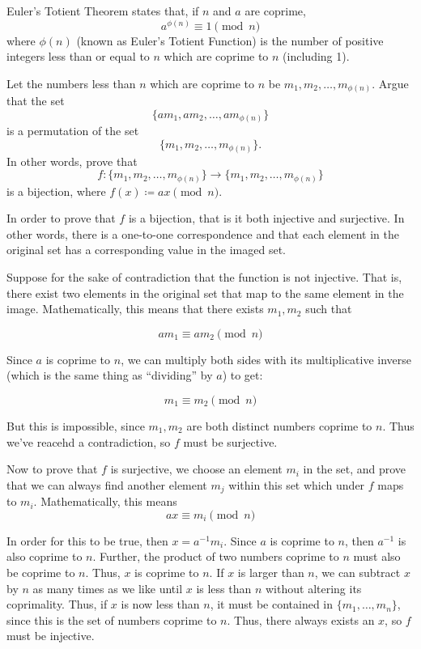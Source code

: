 \documentclass[11pt]{article}
\begin{document}
\pagebreak
{} 
Euler's Totient Theorem states that, if $n$ and $a$ are coprime,
\[
  a^{\phi(n)} \equiv 1 \pmod{n}
\]
where $\phi(n)$ (known as Euler's Totient Function) is the number of positive
integers less than or equal to $n$ which are coprime to $n$ (including 1).

\begin{Parts}
  \Part Let the numbers less than $n$ which are coprime to $n$ be $m_1, m_2, \ldots, m_{\phi(n)}$. 
  Argue that the set
  \[\{am_1, am_2, \ldots, am_{\phi(n)}\}\]
  is a permutation of the set
  \[\{m_1, m_2, \ldots, m_{\phi(n)}\}.\]
  In other words, prove that 
  \[f:\{m_1, m_2, \ldots, m_{\phi(n)}\} \to \{m_1, m_2, \ldots, m_{\phi(n)}\}\]
  is a bijection, where $f(x) \coloneqq ax \pmod{n}$.


  \begin{solution}
    In order to prove that $f$ is a bijection, that is it both injective and surjective. In other words, there is a one-to-one correspondence and that each element in the original set has a corresponding value in the imaged set.

    Suppose for the sake of contradiction that the function is not injective. That is, there exist two elements in the original set that map to the same element in the image. Mathematically, this means that there exists $m_1, m_2$ such that 

    \[ am_1 \equiv am_2 \pmod n\]
    
    Since $a$ is coprime to $n$, we can multiply both sides with its multiplicative inverse (which is the same thing as ``dividing'' by $a$) to get:
    
    \[ m_1 \equiv m_2 \pmod n\]

    But this is impossible, since $m_1, m_2$ are both distinct numbers coprime to $n$. Thus we've reacehd a contradiction, so $f$ must be surjective. 

    Now to prove that $f$ is surjective, we choose an element $m_i$ in the set, and prove that we can always find another element $m_j$ within this set which under $f$ maps to $m_i$. Mathematically, this means 
    \[ ax \equiv m_i \pmod n\]
    
    In order for this to be true, then $x = a^{-1}m_i$. Since $a$ is coprime to $n$, then $a^{-1}$ is also coprime to $n$. Further, the product of two numbers coprime to $n$ must also be coprime to $n$. Thus, $x$ is coprime to $n$. If $x$ is larger than $n$, we can subtract $x$ by $n$ as many times as we like until $x$ is less than $n$ without altering its coprimality. Thus, if $x$ is now less than $n$, it must be contained in $\{m_1, \dots, m_n\}$, since this is the set of numbers coprime to $n$. Thus, there always exists an $x$, so $f$ must be injective.


\end{solution}
\end{Parts}
\end{document}
